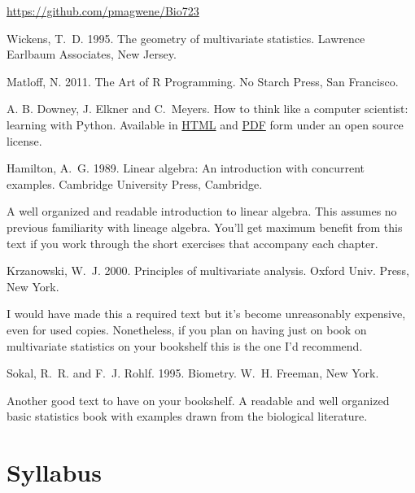 \documentclass[11pt,letterpaper]{article}
\begin{document}
\href{https://github.com/pmagwene/Bio723}{https://github.com/pmagwene/Bio723}

\renewcommand{\refname}{Texts}
\begin{thebibliography}{99}

 Wickens, T.\ D. 1995. The geometry of multivariate statistics. Lawrence Earlbaum Associates, New Jersey.

 Matloff, N. 2011. The Art of R Programming. No Starch Press, San Francisco.

A. B. Downey, J. Elkner  and C.\ Meyers. How to think like a computer scientist: learning with Python. Available in \href{http://www.greenteapress.com/thinkpython/html/index.html}{HTML} and \href{http://www.greenteapress.com/thinkpython/thinkpython.pdf}{PDF} form under an open source license.



\end{thebibliography}

\renewcommand{\refname}{Other Recommended Texts}

\begin{thebibliography}{99}
\setcounter{enumiv}{5}
 Hamilton, A.\ G. 1989. Linear algebra: An introduction with concurrent examples. Cambridge University Press, Cambridge.

A well organized and readable introduction to linear algebra. This assumes no previous familiarity with lineage algebra.  You'll get maximum benefit from this text if you work through the short exercises that accompany each chapter.

 Krzanowski, W.\ J. 2000. Principles of multivariate analysis. Oxford Univ. Press, New York.

I would have made this a required text but it's become unreasonably expensive, even for used copies. Nonetheless, if you plan on having just on book on multivariate statistics on your bookshelf this is the one I'd recommend.

 Sokal, R.\ R. and F.\ J. Rohlf. 1995. Biometry. W.\ H. Freeman, New York.

Another good text to have on your bookshelf. A readable and well organized basic statistics book with examples drawn from the biological literature.

\end{thebibliography}

\section*{Syllabus}
\end{document}
